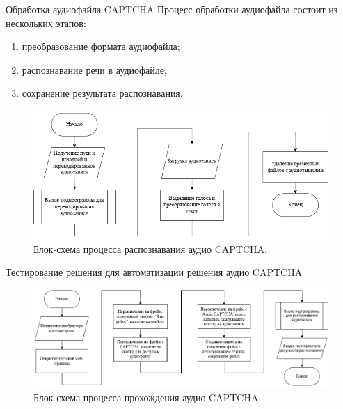 \documentclass[12pt,a4paper,mathserif]{beamer}
\begin{document}
\begin{frame}{Обработка аудиофайла CAPTCHA}
    \setlength{\parindent}{0.5cm}
    Процесс обработки аудиофайла состоит из нескольких этапов:
    
    \begin{enumerate}
        \item преобразование формата аудиофайла;
        \item распознавание речи в аудиофайле;
        \item сохранение результата распознавания.
    \end{enumerate}

    \begin{figure}[H]
        \centering
        \includegraphics[width=0.8\linewidth]{imgs/flowchart-asr.png}
        \caption{Блок-схема процесса распознавания аудио CAPTCHA.}
    \end{figure}
\end{frame}

\begin{frame}{\small Тестирование решения для автоматизации решения аудио CAPTCHA}
    \begin{figure}
        \centering
        \includegraphics[width=1\linewidth]{imgs/flowchart-solve.png}
        \caption{Блок-схема процесса прохождения аудио CAPTCHA.}
    \end{figure}
\end{frame}
\end{document}
